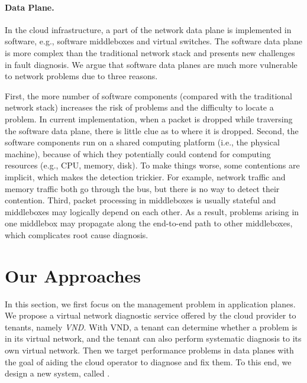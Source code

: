 \paragraph{Data Plane.}
In the cloud infrastructure, a part of the network data plane is implemented in software, e.g.,
software middleboxes and virtual switches. The software data plane is more complex than
the traditional network stack and presents new challenges in fault diagnosis. We argue that software data planes
are much more vulnerable to network problems due to three reasons.

First, the more number of software components (compared with the traditional network stack) increases 
the risk of problems and the difficulty to locate a problem. In current implementation, when a packet 
is dropped while traversing the software data plane, there is little clue as to where it is dropped.
Second, the software components run on a shared computing platform (i.e., the physical machine), because of
which they potentially could contend for computing resources (e.g., CPU, memory, disk). 
To make things worse, some contentions
are implicit, which makes the detection trickier. For example, network traffic and memory
traffic both go through the bus, but there is no way to detect their contention.
Third, packet processing in middleboxes is usually stateful and middleboxes may logically depend
on each other. As a result, problems arising in one middlebox may propagate along the end-to-end path
to other middleboxes, which complicates root cause diagnosis. 

\section{Our Approaches}
\label{sec:back:approach}
In this section, we first focus on the management problem in application planes. 
We propose a virtual network diagnostic service offered by the cloud provider 
to tenants, namely \emph{VND.} With VND, a tenant can determine whether a problem is in its virtual 
network, and the tenant can also perform systematic diagnosis to its own virtual network.
Then we target performance problems in data planes with the goal of aiding the cloud operator
to diagnose and fix them. To this end, we design a new system, called \Name. 

